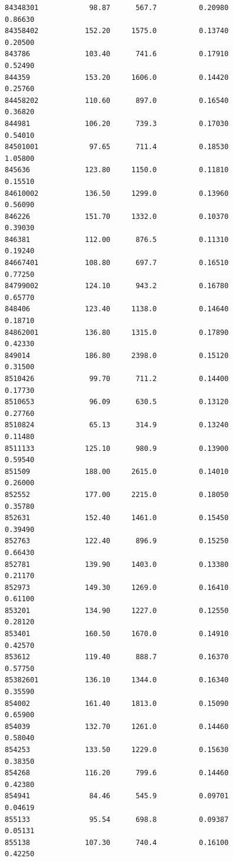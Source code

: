 \documentclass[
  letterpaper,
  DIV=11,
  numbers=noendperiod]{scrartcl}
\begin{document}
\begin{verbatim}
84348301            98.87      567.7          0.20980           0.86630
84358402           152.20     1575.0          0.13740           0.20500
843786             103.40      741.6          0.17910           0.52490
844359             153.20     1606.0          0.14420           0.25760
84458202           110.60      897.0          0.16540           0.36820
844981             106.20      739.3          0.17030           0.54010
84501001            97.65      711.4          0.18530           1.05800
845636             123.80     1150.0          0.11810           0.15510
84610002           136.50     1299.0          0.13960           0.56090
846226             151.70     1332.0          0.10370           0.39030
846381             112.00      876.5          0.11310           0.19240
84667401           108.80      697.7          0.16510           0.77250
84799002           124.10      943.2          0.16780           0.65770
848406             123.40     1138.0          0.14640           0.18710
84862001           136.80     1315.0          0.17890           0.42330
849014             186.80     2398.0          0.15120           0.31500
8510426             99.70      711.2          0.14400           0.17730
8510653             96.09      630.5          0.13120           0.27760
8510824             65.13      314.9          0.13240           0.11480
8511133            125.10      980.9          0.13900           0.59540
851509             188.00     2615.0          0.14010           0.26000
852552             177.00     2215.0          0.18050           0.35780
852631             152.40     1461.0          0.15450           0.39490
852763             122.40      896.9          0.15250           0.66430
852781             139.90     1403.0          0.13380           0.21170
852973             149.30     1269.0          0.16410           0.61100
853201             134.90     1227.0          0.12550           0.28120
853401             160.50     1670.0          0.14910           0.42570
853612             119.40      888.7          0.16370           0.57750
85382601           136.10     1344.0          0.16340           0.35590
854002             161.40     1813.0          0.15090           0.65900
854039             132.70     1261.0          0.14460           0.58040
854253             133.50     1229.0          0.15630           0.38350
854268             116.20      799.6          0.14460           0.42380
854941              84.46      545.9          0.09701           0.04619
855133              95.54      698.8          0.09387           0.05131
855138             107.30      740.4          0.16100           0.42250

\end{verbatim}
\end{document}

